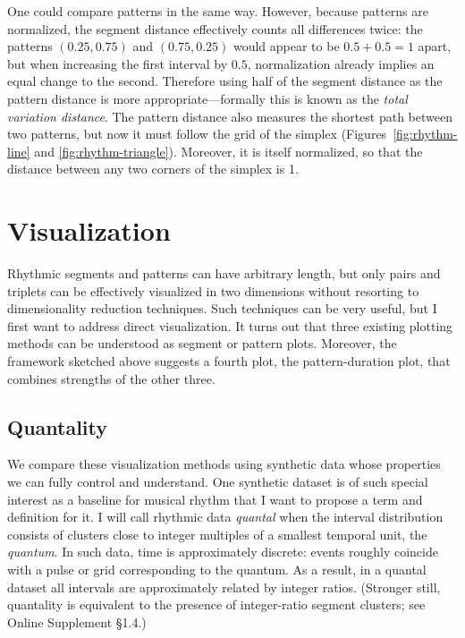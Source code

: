 \documentclass{tMAM2e}%
\theoremstyle{plain}
\theoremstyle{definition}
\theoremstyle{remark}
\newcommand{\suppl}[1]{Online Supplement §#1}
\begin{document}
One could compare patterns in the same way. 
However, because patterns are normalized, the segment distance effectively counts all differences twice: the patterns $(0.25, 0.75)$ and $(0.75, 0.25)$ would appear to be $0.5 + 0.5 = 1$ apart, but when increasing the first interval by $0.5$, normalization already implies an equal change to the second. 
Therefore using half of the segment distance as the pattern distance is more appropriate—formally this is known as the \emph{total variation distance}. 
The pattern distance also measures the shortest path between two patterns, but now it must follow the grid of the simplex (Figures~\ref{fig:rhythm-line} and \ref{fig:rhythm-triangle}). 
Moreover, it is itself normalized, so that the distance between any two corners of the simplex is 1.


\section{Visualization}%
\label{sec:visualization}


Rhythmic segments and patterns can have arbitrary length, but only pairs and triplets can be effectively visualized in two dimensions without resorting to dimensionality reduction techniques. 
Such techniques can be very useful, but I first want to address direct visualization. 
It turns out that three existing plotting methods can be understood as segment or pattern plots. 
Moreover, the framework sketched above suggests a fourth plot, the pattern-duration plot, that combines strengths of the other three. 


\subsection{Quantality}

We compare these visualization methods using synthetic data whose properties we can fully control and understand. 
One synthetic dataset is of such special interest as a baseline for musical rhythm that I want to propose a term and definition for it. 
I will call rhythmic data \emph{quantal} when the interval distribution consists of clusters close to integer multiples of a smallest temporal unit, the \emph{quantum}. 
In such data, time is approximately discrete: events roughly coincide with a pulse or grid corresponding to the quantum. 
As a result, in a quantal dataset all intervals are approximately related by integer ratios. 
(Stronger still, quantality is equivalent to the presence of integer-ratio segment clusters; see \suppl{1.4}.)
\end{document}
